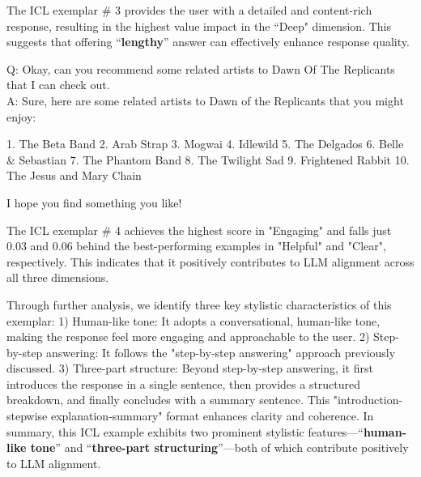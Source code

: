 The ICL exemplar \# 3 provides the user with a detailed and content-rich response, resulting in the highest value impact in the ``Deep" dimension. This suggests that offering ``\textbf{lengthy}'' answer can effectively enhance response quality.

\begin{tcolorbox}[fonttitle = \small\bfseries, title=ICL exemplar \# 4 with highest ``Engaging'',colframe=gray!2!black,colback=gray!2!white,boxrule=1pt,boxsep=0pt,left=5pt,right=5pt,fontupper=\footnotesize, halign title = flush center]
Q: Okay, can you recommend some related artists to Dawn Of The Replicants that I can check out.\\
A: Sure, here are some related artists to Dawn of the Replicants that you might enjoy:

1. The Beta Band
2. Arab Strap
3. Mogwai
4. Idlewild
5. The Delgados
6. Belle \& Sebastian
7. The Phantom Band
8. The Twilight Sad
9. Frightened Rabbit
10. The Jesus and Mary Chain

I hope you find something you like!
\end{tcolorbox}

The ICL exemplar \# 4 achieves the highest score in "Engaging" and falls just 0.03 and 0.06 behind the best-performing examples in "Helpful" and "Clear", respectively. This indicates that it positively contributes to LLM alignment across all three dimensions. 

Through further analysis, we identify three key stylistic characteristics of this exemplar: 1) Human-like tone: It adopts a conversational, human-like tone, making the response feel more engaging and approachable to the user. 2) Step-by-step answering: It follows the "step-by-step answering" approach previously discussed. 3) Three-part structure: Beyond step-by-step answering, it first introduces the response in a single sentence, then provides a structured breakdown, and finally concludes with a summary sentence. This "introduction-stepwise explanation-summary" format enhances clarity and coherence. In summary, this ICL example exhibits two prominent stylistic features—``\textbf{human-like tone}'' and ``\textbf{three-part structuring}''—both of which contribute positively to LLM alignment.

